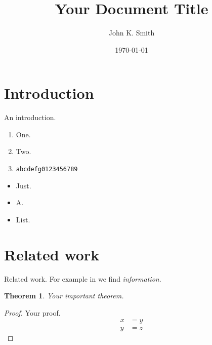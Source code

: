 \documentclass[11pt,a4paper,twocolumn]{article}
\title{Your Document Title}
\author{John K. Smith}
\date{\today}
\newtheorem{theorem}{Theorem}[section]
\begin{document}




\section{Introduction}

An introduction.

\begin{enumerate}
    \item One.
    \item Two.
    \item \texttt{abcdefg0123456789}
\end{enumerate}

\begin{itemize}
    \item Just.
    \item A.
    \item List.
\end{itemize}



\section{Related work}

Related work. For example in \cite{shannon-entropy} we find \textit{information}.

\begin{theorem}
    Your important theorem.
\end{theorem}
\begin{proof}
    Your proof.
    \begin{equation}
        \begin{aligned}
            x &= y\\
            y &= z
        \end{aligned}
        \label{eq:example-eq}
    \end{equation}
\end{proof}
\end{document}
